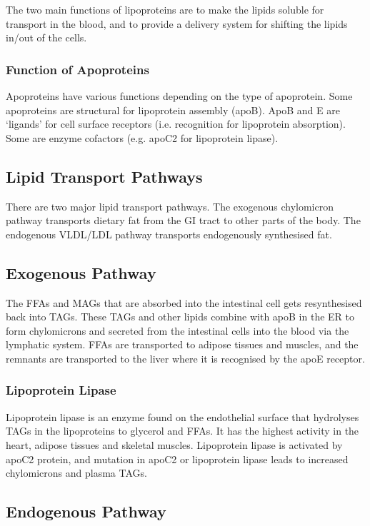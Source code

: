\documentclass[a4paper, 12pt]{report}
\begin{document}
The two main functions of lipoproteins are to make the lipids soluble for transport in the blood, and to provide a delivery system for shifting the lipids in/out of the cells.

\subsubsection{Function of Apoproteins}

Apoproteins have various functions depending on the type of apoprotein.
Some apoproteins are structural for lipoprotein assembly (apoB).
ApoB and E are `ligands' for cell surface receptors (i.e. recognition for lipoprotein absorption).
Some are enzyme cofactors (e.g. apoC2 for lipoprotein lipase).

\subsection{Lipid Transport Pathways}

There  are two major lipid transport pathways.
The exogenous chylomicron pathway transports dietary fat from the GI tract to other parts of the body.
The endogenous VLDL/LDL pathway transports endogenously synthesised fat.

\subsection{Exogenous Pathway}

The FFAs and MAGs that are absorbed into the intestinal cell gets resynthesised back into TAGs.
These TAGs and other lipids combine with apoB in the ER to form chylomicrons and secreted from the intestinal cells into the blood via the lymphatic system.
FFAs are transported to adipose tissues and muscles, and the remnants are transported to the liver where it is recognised by the apoE receptor.

\subsubsection{Lipoprotein Lipase}

Lipoprotein lipase is an enzyme found on the endothelial surface that hydrolyses TAGs in the lipoproteins to glycerol and FFAs.
It has the highest activity in the heart, adipose tissues and skeletal muscles.
Lipoprotein lipase is activated by apoC2 protein, and mutation in apoC2 or lipoprotein lipase leads to increased chylomicrons and plasma TAGs.

\subsection{Endogenous Pathway}
\end{document}
